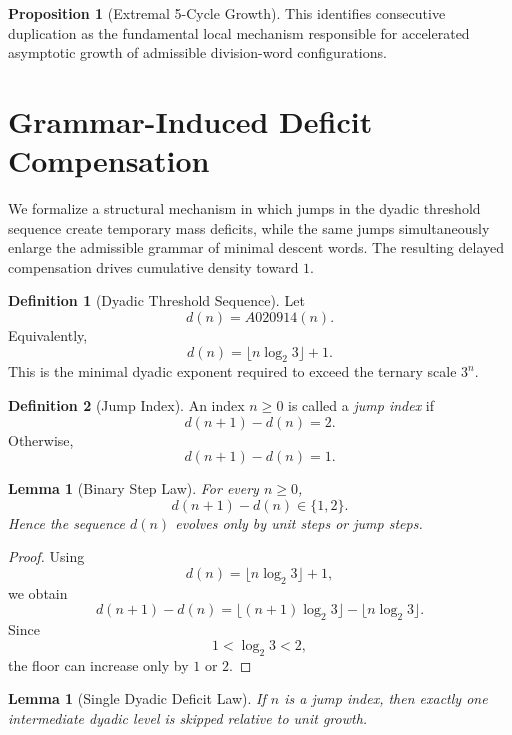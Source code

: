 \documentclass[12pt, oneside]{article}
\numberwithin{equation}{section}
\theoremstyle{definition}
\newtheorem{definition}{Definition}[section]
\newtheorem{proposition}{Proposition}[section]
\theoremstyle{plain}
\newtheorem{lemma}[theorem]{Lemma}
\theoremstyle{remark}
\begin{document}
\begin{proposition}[Extremal 5-Cycle Growth]
This identifies consecutive duplication as the fundamental local
mechanism responsible for accelerated asymptotic growth of admissible
division-word configurations.

\section{Grammar-Induced Deficit Compensation}
\label{sec:grammar-compensation}

We formalize a structural mechanism in which jumps in the dyadic
threshold sequence create temporary mass deficits, while the same jumps
simultaneously enlarge the admissible grammar of minimal descent words.
The resulting delayed compensation drives cumulative density toward $1$.


\begin{definition}[Dyadic Threshold Sequence]
Let
\[
d(n)=A020914(n).
\]
Equivalently,
\[
d(n)=\lfloor n\log_2 3 \rfloor + 1.
\]
This is the minimal dyadic exponent required to exceed the ternary scale
$3^n$.
\end{definition}


\begin{definition}[Jump Index]
An index $n\ge0$ is called a \emph{jump index} if
\[
d(n+1)-d(n)=2.
\]
Otherwise,
\[
d(n+1)-d(n)=1.
\]
\end{definition}


\begin{lemma}[Binary Step Law]
\label{lem:binary-step}
For every $n\ge0$,
\[
d(n+1)-d(n)\in\{1,2\}.
\]
Hence the sequence $d(n)$ evolves only by unit steps or jump steps.
\end{lemma}

\begin{proof}
Using
\[
d(n)=\lfloor n\log_2 3\rfloor+1,
\]
we obtain
\[
d(n+1)-d(n)
=
\lfloor (n+1)\log_2 3\rfloor-\lfloor n\log_2 3\rfloor.
\]
Since
\[
1<\log_2 3<2,
\]
the floor can increase only by $1$ or $2$.
\end{proof}


\begin{lemma}[Single Dyadic Deficit Law]
\label{lem:deficit-law}
If $n$ is a jump index, then exactly one intermediate dyadic level is
skipped relative to unit growth.


\end{lemma}
\end{proposition}
\end{document}
